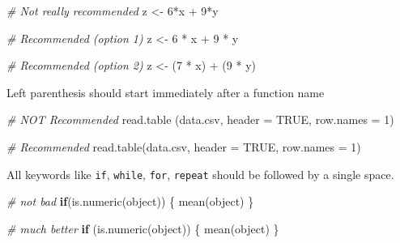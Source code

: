 \documentclass[
]{book}
\newenvironment{Shaded}{\begin{snugshade}}{\end{snugshade}}
\newcommand{\AttributeTok}[1]{\textcolor[rgb]{0.77,0.63,0.00}{#1}}
\newcommand{\CommentTok}[1]{\textcolor[rgb]{0.56,0.35,0.01}{\textit{#1}}}
\newcommand{\ConstantTok}[1]{\textcolor[rgb]{0.00,0.00,0.00}{#1}}
\newcommand{\ControlFlowTok}[1]{\textcolor[rgb]{0.13,0.29,0.53}{\textbf{#1}}}
\newcommand{\DecValTok}[1]{\textcolor[rgb]{0.00,0.00,0.81}{#1}}
\newcommand{\FunctionTok}[1]{\textcolor[rgb]{0.00,0.00,0.00}{#1}}
\newcommand{\NormalTok}[1]{#1}
\newcommand{\OtherTok}[1]{\textcolor[rgb]{0.56,0.35,0.01}{#1}}
\newcommand{\SpecialCharTok}[1]{\textcolor[rgb]{0.00,0.00,0.00}{#1}}
\newcommand{\StringTok}[1]{\textcolor[rgb]{0.31,0.60,0.02}{#1}}
\begin{document}
\begin{Shaded}
\begin{Highlighting}[]
\CommentTok{\# Not really recommended }
\NormalTok{z }\OtherTok{\textless{}{-}} \DecValTok{6}\SpecialCharTok{*}\NormalTok{x }\SpecialCharTok{+} \DecValTok{9}\SpecialCharTok{*}\NormalTok{y}

\CommentTok{\# Recommended (option 1)}
\NormalTok{z }\OtherTok{\textless{}{-}} \DecValTok{6} \SpecialCharTok{*}\NormalTok{ x }\SpecialCharTok{+} \DecValTok{9} \SpecialCharTok{*}\NormalTok{ y}

\CommentTok{\# Recommended (option 2)}
\NormalTok{z }\OtherTok{\textless{}{-}}\NormalTok{ (}\DecValTok{7} \SpecialCharTok{*}\NormalTok{ x) }\SpecialCharTok{+}\NormalTok{ (}\DecValTok{9} \SpecialCharTok{*}\NormalTok{ y)}
\end{Highlighting}
\end{Shaded}

Left parenthesis should start immediately after a function name

\begin{Shaded}
\begin{Highlighting}[]
\CommentTok{\# NOT Recommended }
\FunctionTok{read.table}\NormalTok{ (}\StringTok{\textquotesingle{}data.csv\textquotesingle{}}\NormalTok{, }\AttributeTok{header =} \ConstantTok{TRUE}\NormalTok{, }\AttributeTok{row.names =} \DecValTok{1}\NormalTok{)}

\CommentTok{\# Recommended }
\FunctionTok{read.table}\NormalTok{(}\StringTok{\textquotesingle{}data.csv\textquotesingle{}}\NormalTok{, }\AttributeTok{header =} \ConstantTok{TRUE}\NormalTok{, }\AttributeTok{row.names =} \DecValTok{1}\NormalTok{)}
\end{Highlighting}
\end{Shaded}

All keywords like \texttt{if}, \texttt{while}, \texttt{for}, \texttt{repeat} should be followed by a single
space.

\begin{Shaded}
\begin{Highlighting}[]
\CommentTok{\# not bad}
\ControlFlowTok{if}\NormalTok{(}\FunctionTok{is.numeric}\NormalTok{(object)) \{}
  \FunctionTok{mean}\NormalTok{(object)}
\NormalTok{\}}

\CommentTok{\# much better}
\ControlFlowTok{if}\NormalTok{ (}\FunctionTok{is.numeric}\NormalTok{(object)) \{}
  \FunctionTok{mean}\NormalTok{(object)}
\NormalTok{\}}
\end{Highlighting}
\end{Shaded}
\end{document}
